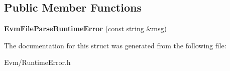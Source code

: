 \subsection*{Public Member Functions}
\begin{DoxyCompactItemize}
\item 
\mbox{\label{struct_evm_1_1_evm_file_parse_runtime_error_afda9b72b748cd4ac4c6becb0659b2f46}} 
{\bfseries Evm\+File\+Parse\+Runtime\+Error} (const string \&msg)
\end{DoxyCompactItemize}


The documentation for this struct was generated from the following file\+:\begin{DoxyCompactItemize}
\item 
Evm/Runtime\+Error.\+h\end{DoxyCompactItemize}
